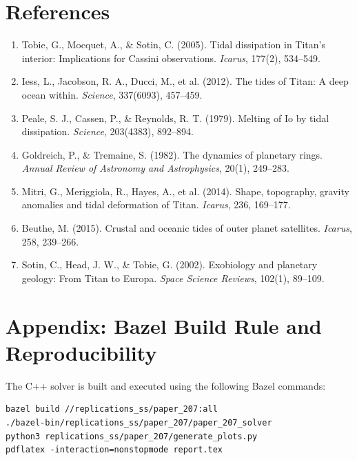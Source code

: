 \documentclass[11pt,a4paper]{article}
\begin{document}
\section*{References}
\begin{enumerate}
    \item Tobie, G., Mocquet, A., \& Sotin, C. (2005). Tidal dissipation in Titan's interior: Implications for Cassini observations. \textit{Icarus}, 177(2), 534--549.
    \item Iess, L., Jacobson, R. A., Ducci, M., et al. (2012). The tides of Titan: A deep ocean within. \textit{Science}, 337(6093), 457--459.
    \item Peale, S. J., Cassen, P., \& Reynolds, R. T. (1979). Melting of Io by tidal dissipation. \textit{Science}, 203(4383), 892--894.
    \item Goldreich, P., \& Tremaine, S. (1982). The dynamics of planetary rings. \textit{Annual Review of Astronomy and Astrophysics}, 20(1), 249--283.
    \item Mitri, G., Meriggiola, R., Hayes, A., et al. (2014). Shape, topography, gravity anomalies and tidal deformation of Titan. \textit{Icarus}, 236, 169--177.
    \item Beuthe, M. (2015). Crustal and oceanic tides of outer planet satellites. \textit{Icarus}, 258, 239--266.
    \item Sotin, C., Head, J. W., \& Tobie, G. (2002). Exobiology and planetary geology: From Titan to Europa. \textit{Space Science Reviews}, 102(1), 89--109.
\end{enumerate}

\appendix
\section{Appendix: Bazel Build Rule and Reproducibility}
The C++ solver is built and executed using the following Bazel commands:
\begin{verbatim}
bazel build //replications_ss/paper_207:all
./bazel-bin/replications_ss/paper_207/paper_207_solver
python3 replications_ss/paper_207/generate_plots.py
pdflatex -interaction=nonstopmode report.tex
\end{verbatim}
\end{document}
